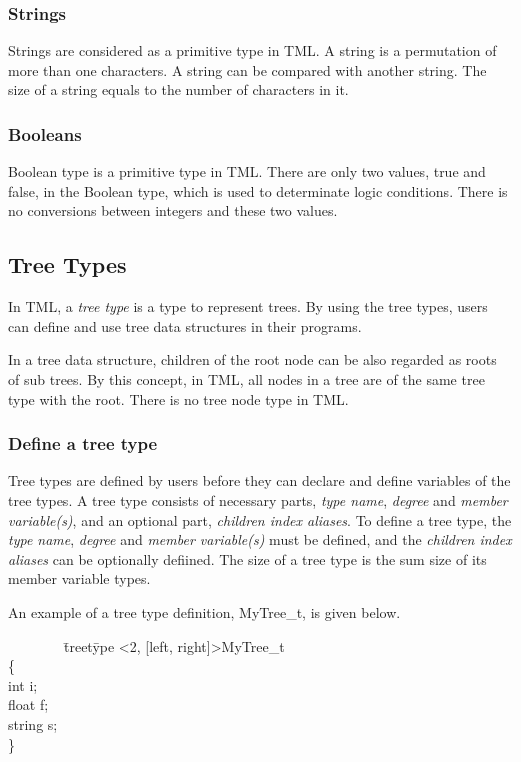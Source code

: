 \documentclass[12pt,psfig,a4]{article}
\begin{document}
\subsubsection {Strings}
Strings are considered as a primitive type in TML. A string is a permutation of more than one characters. A string can be compared with another string. The size of a string equals to the number of characters in it.

\subsubsection {Booleans}
Boolean type is a primitive type in TML. There are only two values, true and false, in the Boolean type, which is used to determinate logic conditions. There is no conversions between integers and these two values.

\subsection {Tree Types}
In TML, a \textit{tree type} is a type to represent trees. By using the tree types, users can define and use tree data structures in their programs.

In a tree data structure, children of the root node can be also regarded as roots of sub trees. By this concept, in TML, all nodes in a tree are of the same tree type with the root. There is no tree node type in TML.

\subsubsection {Define a tree type}
Tree types are defined by users before they can declare and define variables of the tree types. A tree type consists of necessary parts, \textit{type name}, \textit{degree} and \textit{member variable(s)}, and an optional part, \textit{children index aliases}. To define a tree type, the \textit{type name}, \textit{degree} and \textit{member variable(s)} must be defined, and the \textit{children index aliases} can be optionally defiined. The size of a tree type is the sum size of its member variable types.

An example of a tree type definition, MyTree\_t, is given below.

\begin{code}
\begin{tabbing}
~~~~~~~~\= treet\=ype \textless2, [left, right]\textgreater MyTree\_t \\
\> \{ \\
\> \>int i;\\
\> \>float f;\\
\> \>string s;\\
\> \}
\end{tabbing}
\end{code}
\end{document}
